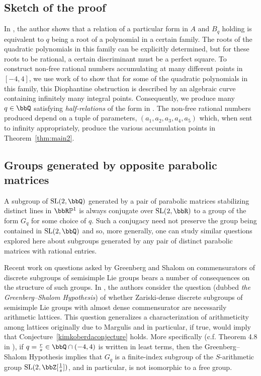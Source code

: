 \documentclass[11 pt]{amsart}
\begin{document}
\subsection{Sketch of the proof}
In \cite{Smilga2021}, the author shows that a relation of a particular form in $A$ and $B_q$ holding is equivalent to $q$ being a root of a polynomial in a certain family. The roots of the quadratic polynomials in this family can be explicitly determined, but for these roots to be rational, a certain discriminant must be a perfect square. To construct non-free rational numbers accumulating at many different points in $[-4,4]$, we use work of \cite{SILVERMAN2000163} to show that for some of the quadratic polynomials in this family, this Diophantine obstruction is described by an algebraic curve containing infinitely many integral points. Consequently, we produce many $q\in\bbQ$ satisfying \textit{half-relations} of the form in \cite{Smilga2021}. The non-free rational numbers produced depend on a tuple of parameters, $(a_1,a_2,a_3,a_4,a_5)$ which, when sent to infinity appropriately, produce the various accumulation points in Theorem~\ref{thm:main2}.

\subsection{Groups generated by opposite parabolic matrices}
A subgroup of $\operatorname{SL}(2,\bbQ)$ generated by a pair of parabolic matrices stabilizing distinct lines in $\bbR\mathbb{P}^1$ is always conjugate over $\operatorname{SL}(2,\bbR)$ to a group of the form $G_q$ for some choice of $q$. Such a conjugacy need not preserve the group being contained in $\operatorname{SL}(2,\bbQ)$ and so, more generally, one can study similar questions explored here about subgroups generated by any pair of distinct parabolic matrices with rational entries.

Recent work on questions asked by Greenberg and Shalom on commensurators of discrete subgroups of semisimple Lie groups bears a number of consequences on the structure of such groups. In \cite{brody-fisher-mj-limbeek-2023}, the authors consider the question (dubbed \textit{the Greenberg--Shalom Hypothesis}) of whether Zariski-dense discrete subgroups of semisimple Lie groups with almost dense commensurator are necessarily arithmetic lattices. This question generalizes a characterization of arithmeticity among lattices originally due to Margulis and in particular, if true, would imply that Conjecture~\ref{kimkoberdaconjecture} holds. More specifically (c.f. Theorem 4.8 in \cite{brody-fisher-mj-limbeek-2023}), if $q=\frac{r}{s}\in\bbQ\cap(-4,4)$ is written in least terms, then the Greenberg--Shalom Hypothesis implies that $G_q$ is a finite-index subgroup of the $S$-arithmetic group $\operatorname{SL}(2,\bbZ[\frac{1}{s}])$, and in particular, is not isomorphic to a free group. 
\end{document}
